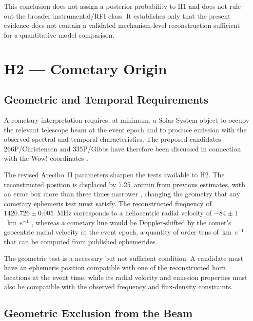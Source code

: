 \documentclass[twocolumn]{aastex701}
\begin{document}
This conclusion does not assign a posterior probability to H1 and does not rule out the broader instrumental/RFI class. It establishes only that the present evidence does not contain a validated mechanism-level reconstruction sufficient for a quantitative model comparison.


\section{H2 --- Cometary Origin}
\label{sec:h2}

\subsection{Geometric and Temporal Requirements}

A cometary interpretation requires, at minimum, a Solar System object to occupy the relevant telescope beam at the event epoch and to produce emission with the observed spectral and temporal characteristics. The proposed candidates 266P/Christensen and 335P/Gibbs have therefore been discussed in connection with the Wow! coordinates \citep{paris2017}.

The revised Arecibo~II parameters sharpen the tests available to H2. The reconstructed position is displaced by 7.25~arcmin from previous estimates, with an error box more than three times narrower \citep{mendez2025}, changing the geometry that any cometary ephemeris test must satisfy. The reconstructed frequency of $1420.726\pm0.005$~MHz corresponds to a heliocentric radial velocity of $-84\pm1$~km~s$^{-1}$ \citep{mendez2025}, whereas a cometary  line would be Doppler-shifted by the comet's geocentric radial velocity at the event epoch, a quantity of order tens of~km~s$^{-1}$ that can be computed from published ephemerides.

The geometric test is a necessary but not sufficient condition. A candidate must have an ephemeris position compatible with one of the reconstructed horn locations at the event time, while its radial velocity and emission properties must also be compatible with the observed frequency and flux-density constraints.

\subsection{Geometric Exclusion from the Beam}
\label{sec:h2_ephem}
\end{document}
